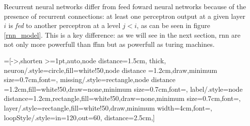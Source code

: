 Recurrent neural networks differ from feed foward neural networks because of the presence of recurrent connections: at least one perceptron output at a given layer $i$ is \textit{fed} to another perceptron
at a level $j<i$, as can be seen in figure \ref{rnn_model}. This is a key difference: as we will see in the next section, rnn are not only more powerfull than ffnn but as powerfull as turing machines.


=[->,shorten >=1pt,auto,node distance=1.5cm,
  thick,
  neuron/.style={circle,fill=white!50,node distance =1.2cm,draw,minimum size=0.7cm,font=\sffamily\Large\bfseries},
  missing/.style={rectangle,node distance =1.2cm,fill=white!50,draw=none,minimum size=0.7cm,font=\sffamily\Huge\bfseries},
  label/.style={node distance=1.2cm,rectangle,fill=white!50,draw=none,minimum size=0.7cm,font=\sffamily\normalsize},
  layer/.style={rectangle,fill=white!50,draw,minimum width=4cm,font=\sffamily\normalsize},
  loopStyle/.style={in=120,out=60, distance=2.5cm},]
